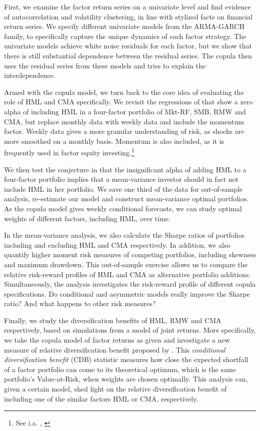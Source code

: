 First, we examine the factor return series on a univariate level and find evidence of autocorrelation and volatility clustering, in line with stylized facts on financial return series. We specify different univariate models from the ARMA-GARCH family, to specifically capture the unique dynamics of each factor strategy. The univariate models achieve white noise residuals for each factor, but we show that there is still substantial dependence between the residual series. The copula then uses the residual series from these models and tries to explain the interdependence.

Armed with the copula model, we turn back to the core idea of evaluating the role of HML and CMA specifically. We revisit the regressions of \textcite{FF2015} that show a zero alpha of including HML in a four-factor portfolio of Mkt-RF, SMB, RMW and CMA, but replace monthly data with weekly data and include the momentum factor. Weekly data gives a more granular understanding of risk, as shocks are more smoothed on a monthly basis. Momentum is also included, as it is frequently used in factor equity investing.\footnote{See i.a. \textcite{Pedersen2015}, \textcite{Ilmanen2011}} 

We then test the conjecture in \textcite{FF2015} that the insignificant alpha of adding HML to a four-factor portfolio implies that a mean-variance investor should in fact not include HML in her portfolio. We save one third of the data for out-of-sample analysis, re-estimate our model and construct mean-variance optimal portfolios. As the copula model gives weekly conditional forecasts, we can study optimal weights of different factors, including HML, over time.

In the mean-variance analysis, we also calculate the Sharpe ratios of portfolios including and excluding HML and CMA respectively. In addition, we also quantify higher moment risk measures of competing portfolios, including skewness and maximum drawdown. This out-of-sample exercise allows us to compare the relative risk-reward profiles of HML and CMA as alternative portfolio additions. Simultaneously, the analysis investigates the risk-reward profile of different copula specifications. Do conditional and asymmetric models really improve the Sharpe ratio? And what happens to other risk measures?

Finally, we study the diversification benefits of HML, RMW and CMA respectively, based on simulations from a model of joint returns. More specifically, we take the copula model of factor returns as given and investigate a new measure of relative diversification benefit proposed by \textcite{ChristoffersenErrunzaJacobLanglois2012}. This \emph{conditional diversification benefit} (CDB) statistic measures how close the expected shortfall of a factor portfolio can come to its theoretical optimum, which is the same portfolio's Value-at-Risk, when weights are chosen optimally. This analysis can, given a certain model, shed light on the relative diversification benefit of including one of the similar factors HML or CMA, respectively.

